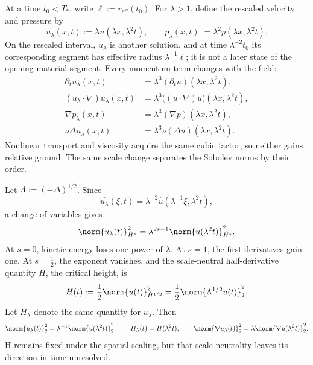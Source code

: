 
At a time \(t_0<T_*\), write \(\ell:=r_{\mathrm{eff}}(t_0)\).
For \(\lambda>1\), define the rescaled velocity and pressure by
\[
  u_\lambda(x,t)
  :=
  \lambda u(\lambda x,\lambda^2t),
  \qquad
  p_\lambda(x,t)
  :=
  \lambda^2p(\lambda x,\lambda^2t).
\]
On the rescaled interval, \(u_\lambda\) is another \NavierStokes{} solution, and at time \(\lambda^{-2}t_0\) its corresponding segment has effective radius \(\lambda^{-1}\ell\); it is not a later state of the opening material segment.
Every momentum term changes with the field:
\[
\begin{aligned}
  \partial_tu_\lambda(x,t)
  &=
  \lambda^3(\partial_tu)(\lambda x,\lambda^2t),
  \\
  (u_\lambda\cdot\nabla)u_\lambda(x,t)
  &=
  \lambda^3\bigl((u\cdot\nabla)u\bigr)(\lambda x,\lambda^2t),
  \\
  \nabla p_\lambda(x,t)
  &=
  \lambda^3(\nabla p)(\lambda x,\lambda^2t),
  \\
  \nu\Delta u_\lambda(x,t)
  &=
  \lambda^3\nu(\Delta u)(\lambda x,\lambda^2t).
\end{aligned}
\]
Nonlinear transport and viscosity acquire the same cubic factor, so neither gains relative ground.
The same scale change separates the Sobolev norms by their order.


Let \(\Lambda:=(-\Delta)^{1/2}\).
Since
\[
  \widehat{u_\lambda}(\xi,t)
  =
  \lambda^{-2}\widehat u(\lambda^{-1}\xi,\lambda^2t),
\]
a change of variables gives
\[
  \norm{u_\lambda(t)}_{\dot H^s}^2
  =
  \lambda^{2s-1}
  \norm{u(\lambda^2t)}_{\dot H^s}^2.
\]
At \(s=0\), kinetic energy loses one power of \(\lambda\).
At \(s=1\), the first derivatives gain one.
At \(s=\tfrac12\), the exponent vanishes, and the scale-neutral half-derivative quantity \(H\), the critical height, is
\[
  H(t)
  :=
  \frac12\norm{u(t)}_{\dot H^{1/2}}^2
  =
  \frac12\norm{\Lambda^{1/2}u(t)}_2^2.
\]
Let \(H_\lambda\) denote the same quantity for \(u_\lambda\).
Then
\[
  \norm{u_\lambda(t)}_2^2
  =
  \lambda^{-1}\norm{u(\lambda^2t)}_2^2,
  \qquad
  H_\lambda(t)=H(\lambda^2t),
  \qquad
  \norm{\nabla u_\lambda(t)}_2^2
  =
  \lambda\norm{\nabla u(\lambda^2t)}_2^2.
\]
H remains fixed under the spatial scaling, but that scale neutrality leaves its direction in time unresolved.


